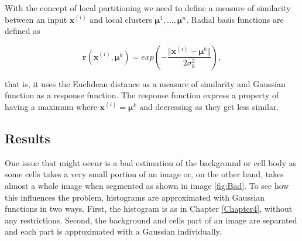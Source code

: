 With the concept of local partitioning we need to define a measure of similarity between an input $\mathbf{x}^{(i)}$ and local clusters $\boldsymbol \mu^1, \ldots, \boldsymbol \mu^n$. Radial basis functions are defined as

\begin{equation}
	\mathbf{r}(\mathbf{x}^{(i)}, \boldsymbol \mu^k) = exp \left (- \frac{\Vert \mathbf{x}^{(i)}  - \boldsymbol \mu^k \Vert}{2\sigma_k^2} \right ),
\end{equation} 

that is, it uses the Euclidean distance as a measure of similarity and Gaussian function as a response function. The response function express a property of having a maximum where $\mathbf{x}^{(i)} = \boldsymbol \mu^k$ and decreasing as they get less similar. 





\subsection{Results}

One issue that might occur is a bad estimation of the background or cell body as some cells takes a very small portion of an image or, on the other hand, takes almost a whole image when segmented as shown in image \ref{fig:Bad}. To see how this influences the problem, histograms are approximated with Gaussian functions in two ways. First, the histogram is as in Chapter \ref{Chapter4}, without any restrictions. Second, the background and cells part of an image are separated and each part is approximated with a Gaussian individually. \\

